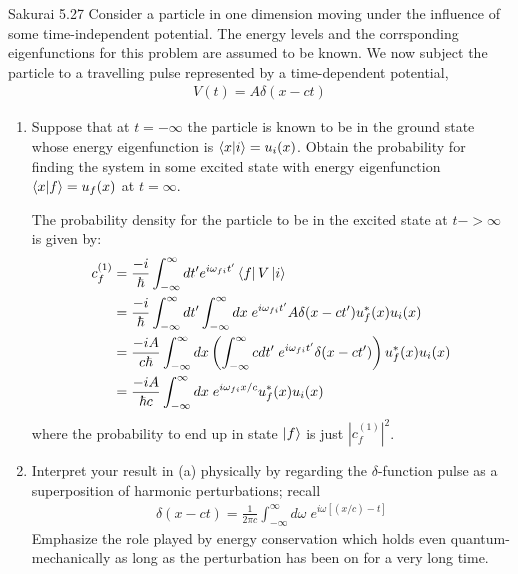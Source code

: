 \documentclass{article}
\begin{document}
\newpage
\begin{section}{Sakurai 5.27}
Consider a particle in one dimension moving under the influence of some time-independent potential. The energy levels and the corrsponding eigenfunctions for this problem are assumed to be known. We now subject the particle to a travelling pulse represented by a time-dependent potential,
\begin{align*}
	V(t) = A \delta(x-ct)
\end{align*}
\begin{enumerate}
	\item Suppose that at $t=-\infty$ the particle is known to be in the ground state whose energy eigenfunction is $\bra{x}\ket{i} = u_i(x)$. Obtain the probability for finding the system in some excited state with energy eigenfunction $\bra{x}\ket{f} = u_f(x)$ at $t=\infty$.

	\begin{tcolorbox}[breakable]
		The probability density for the particle to be in the excited state at $t -> \infty$ is given by:
		\begin{align*}
			c_f^{(1)} & = \frac{-i}{\hbar} \int_{-\infty}^{\infty} dt' e^{i\omega_{fi} t'} \bra{f} V \ket{i}                                                              \\
			          & = \frac{-i}{\hbar} \int_{-\infty}^{\infty} dt' \int_{-\infty}^{\infty} dx\; e^{i\omega_{fi} t'} A \delta(x - ct') u^*_f(x) u_i(x)                 \\
			          & = \frac{-iA}{c\hbar} \int_{-\infty}^{\infty} dx \left( \int_{-\infty}^{\infty} cdt'\; e^{i\omega_{fi} t'} \delta(x - ct') \right) u^*_f(x) u_i(x) \\
			          & = \frac{-iA}{\hbar c} \int_{-\infty}^{\infty} dx\; e^{i\omega_{fi} x/c} u^*_f(x) u_i(x)
		\end{align*}
		where the probability to end up in state $\ket{f}$ is just $\left|c_f^{(1)}\right|^2$.
	\end{tcolorbox}

	\item Interpret your result in (a) physically by regarding the $\delta$-function pulse as a superposition of harmonic perturbations; recall
	\begin{align*}
		\delta(x-ct ) = \frac{1}{2\pi c} \int_{-\infty}^{\infty} d\omega\; e^{i\omega [(x/c) - t]}
	\end{align*}
	Emphasize the role played by energy conservation which holds even quantum-mechanically as long as the perturbation has been on for a very long time.


\end{enumerate}
\end{section}
\end{document}
